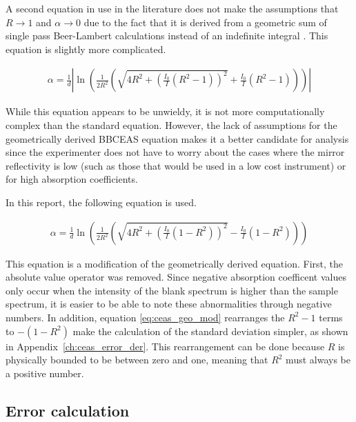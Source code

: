 A second equation in use in the literature does not make the assumptions
that $R \to 1$ and $\alpha \to 0$ due to the fact that it is derived from
a geometric sum of single pass Beer-Lambert calculations instead of an
indefinite integral \cite{Fiedler:2003db}. This equation is slightly more
complicated.

  \begin{align}
    \alpha = \frac{1}{d}\left|\ln\left(\frac{1}{2R^2}\left(\sqrt{4R^2+\left(\frac{I_0}{I}(R^2-1)\right)^2} + \frac{I_0}{I}(R^2-1)\right)\right)\right| \label{eq:ceas_geo}
  \end{align}

While this equation appears to be unwieldy, it is not more computationally
complex than the standard equation. However, the lack of assumptions for the
geometrically derived \ac{BBCEAS} equation makes it a better candidate for
analysis since the experimenter does not have to worry about the cases where
the mirror reflectivity is low (such as those that would be used in a low cost
instrument) or for high absorption coefficients.

In this report, the following equation is used.


\begin{align}
    \alpha = \frac{1}{d}\ln\left(\frac{1}{2R^2}\left(\sqrt{4R^2+\left(\frac{I_0}{I}(1-R^2)\right)^2} - \frac{I_0}{I}(1-R^2)\right)\right) \label{eq:ceas_geo_mod}
\end{align}

This equation is a modification of the geometrically derived equation. First,
the absolute value operator was removed. Since negative absorption coefficent
values only occur when the intensity of the blank spectrum is higher than the
sample spectrum, it is easier to be able to note these abnormalities through
negative numbers. In addition, equation \eqref{eq:ceas_geo_mod} rearranges the
$R^2-1$ terms to $-(1-R^2)$ make the calculation of the standard deviation
simpler, as shown in Appendix~\ref{ch:ceas_error_der}. This rearrangement can
be done because $R$ is physically bounded to be between zero and one, meaning
that $R^2$ must always be a positive number.



\subsection{Error calculation}\label{subsec:ceas_error}

